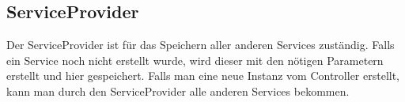 \subsection{ServiceProvider}
Der ServiceProvider ist für das Speichern aller anderen Services zuständig.
Falls ein Service noch nicht erstellt wurde, wird dieser mit den nötigen Parametern erstellt und hier gespeichert.
Falls man eine neue Instanz vom Controller erstellt, kann man durch den ServiceProvider alle anderen Services bekommen.
